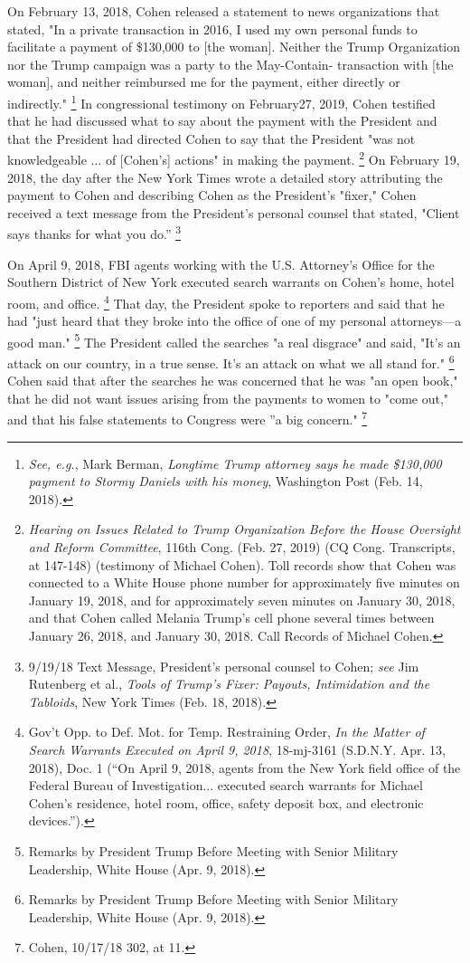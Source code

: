 On February 13, 2018, Cohen released a statement to news organizations that stated, "In a private transaction in 2016, I used my own personal funds to facilitate a payment of \$130,000 to [the woman].
Neither the Trump Organization nor the Trump campaign was a party to the May-Contain- transaction with [the woman], and neither reimbursed me for the payment, either directly or indirectly."%
\footnote{\textit{See, e.g.}, Mark Berman, \textit{Longtime Trump attorney says he made \$130,000 payment to Stormy Daniels with his money}, Washington Post (Feb. 14, 2018).}
In congressional testimony on February27, 2019, Cohen testified that he had discussed what to say about the payment with the President and that the President had directed Cohen to say that the President "was not knowledgeable ... of [Cohen's] actions" in making the payment.%
\footnote{\textit{Hearing on Issues Related to Trump Organization Before the House Oversight and Reform Committee}, 116th Cong.
(Feb. 27, 2019) (CQ Cong. Transcripts, at 147-148) (testimony of Michael Cohen).
Toll records show that Cohen was connected to a White House phone number for approximately five minutes on January 19, 2018, and for approximately seven minutes on January 30, 2018, and that Cohen called Melania Trump’s cell phone several times between January 26, 2018, and January 30, 2018.
Call Records of Michael Cohen.}
On February 19, 2018, the day after the New York Times wrote a detailed story attributing the payment to Cohen and describing Cohen as the President's "fixer," Cohen received a text message from the President's personal counsel that stated, "Client says thanks for what you do.''%
\footnote{9/19/18 Text Message, President’s personal counsel to Cohen;
\textit{see} Jim Rutenberg et al., \textit{Tools of Trump's Fixer: Payouts, Intimidation and the Tabloids}, New York Times (Feb. 18, 2018).}

On April 9, 2018, FBI agents working with the U.S. Attorney's Office for the Southern District of New York executed search warrants on Cohen's home, hotel room, and office.%
\footnote{Gov’t Opp. to Def. Mot. for Temp. Restraining Order, \textit{In the Matter of Search Warrants Executed on April 9, 2018}, 18-mj-3161 (S.D.N.Y. Apr. 13, 2018), Doc. 1
(“On April 9, 2018, agents from the New York field office of the Federal Bureau of Investigation... executed search warrants for Michael Cohen’s residence, hotel room, office, safety deposit box, and electronic devices.”).}
That day, the President spoke to reporters and said that he had "just heard that they broke into the office of one of my personal attorneys—a good man."%
\footnote{Remarks by President Trump Before Meeting with Senior Military Leadership, White House (Apr. 9, 2018).}
The President called the searches "a real disgrace" and said, "It's an attack on our country, in a true sense.
It's an attack on what we all stand for."%
\footnote{Remarks by President Trump Before Meeting with Senior Military Leadership, White House (Apr. 9, 2018).}
Cohen said that after the searches he was concerned that he was "an open book," that he did not want issues arising from the payments to women to "come out," and that his false statements to Congress were ''a big concern."%
\footnote{Cohen, 10/17/18 302, at 11.}

